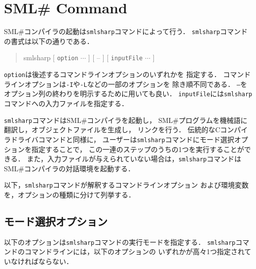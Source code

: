 \documentclass{jbook}
\newcommand{\txt}[2]{#2}
\newcommand{\smlsharp}{SML\#}
\newcommand{\term}[1]{\mbox{{\tt #1}}}
\newenvironment{program}{\begin{quote}\begin{tt}}%
                        {\end{tt}\end{quote}}
\begin{document}
\chapter{\txt{\smlsharp{}コンパイラの起動}{\smlsharp{} Command}}
\ifjp%

	\smlsharp{}コンパイラの起動は{\tt smlsharp}コマンドによって行う．
	{\tt smlsharp}コマンドの書式は以下の通りである．
\begin{program}
smlsharp $[$ \term{option} $\cdots$ $]$ $[$ -- $]$ $[$ \term{inputFile} $\cdots$ $]$
\end{program}
	\term{option}は後述するコマンドラインオプションのいずれかを
指定する．
	コマンドラインオプションは{\tt -I}や{\tt -L}などの一部のオプションを
除き順不同である．
	{\tt --}をオプション列の終わりを明示するために用いても良い．
	\term{inputFile}には{\tt smlsharp}コマンドへの入力ファイルを指定する．

	{\tt smlsharp}コマンドは\smlsharp{}コンパイラを起動し，
\smlsharp{}プログラムを機械語に翻訳し，オブジェクトファイルを生成し，
リンクを行う．
	伝統的なCコンパイラドライバコマンドと同様に，
ユーザーは{\tt smlsharp}コマンドにモード選択オプションを指定することで，
この一連のステップのうちの1つを実行することができる．
	また，入力ファイルが与えられていない場合は，{\tt smlsharp}コマンドは
\smlsharp{}コンパイラの対話環境を起動する．

	以下，{\tt smlsharp}コマンドが解釈するコマンドラインオプション
および環境変数を，オプションの種類に分けて列挙する．

\section{モード選択オプション}

	以下のオプションは{\tt smlsharp}コマンドの実行モードを指定する．
	{\tt smlsharp}コマンドのコマンドラインには，以下のオプションの
いずれかが高々1つ指定されていなければならない．
\end{document}
